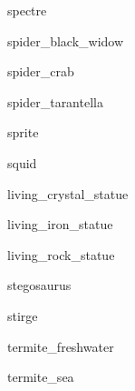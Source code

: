 \documentclass[letterpaper,serif]{module}
\begin{document}
\begin{newmonster}{spectre}\end{newmonster}

\begin{newmonster}{spider_black_widow}\end{newmonster}

\begin{newmonster}{spider_crab}\end{newmonster}

\begin{newmonster}{spider_tarantella}\end{newmonster}

\begin{newmonster}{sprite}\end{newmonster}

\begin{newmonster}{squid}\end{newmonster}

\begin{newmonster}{living_crystal_statue}\end{newmonster}

\begin{newmonster}{living_iron_statue}\end{newmonster}

\begin{newmonster}{living_rock_statue}\end{newmonster}

\begin{newmonster}{stegosaurus}\end{newmonster}

\begin{newmonster}{stirge}\end{newmonster}

\begin{newmonster}{termite_freshwater}\end{newmonster}

\begin{newmonster}{termite_sea}\end{newmonster}
\end{document}
